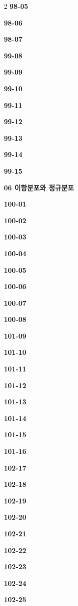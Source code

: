 \documentclass[10pt,a4paper]{article}
\begin{document}
\begin{multicols}{2}
\noindent\textbf{98-05}\ \par
\noindent\textbf{98-06}\ \par
\noindent\textbf{98-07}\ \par
\noindent\textbf{99-08}\ \par
\noindent\textbf{99-09}\ \par
\noindent\textbf{99-10}\ \par
\noindent\textbf{99-11}\ \par
\noindent\textbf{99-12}\ \par
\noindent\textbf{99-13}\ \par
\noindent\textbf{99-14}\ \par
\noindent\textbf{99-15}\ \par
\noindent\textbf{06 이항분포와 정규분포}\par\smallskip
\noindent\textbf{100-01}\ \par
\noindent\textbf{100-02}\ \par
\noindent\textbf{100-03}\ \par
\noindent\textbf{100-04}\ \par
\noindent\textbf{100-05}\ \par
\noindent\textbf{100-06}\ \par
\noindent\textbf{100-07}\ \par
\noindent\textbf{100-08}\ \par
\noindent\textbf{101-09}\ \par
\noindent\textbf{101-10}\ \par
\noindent\textbf{101-11}\ \par
\noindent\textbf{101-12}\ \par
\noindent\textbf{101-13}\ \par
\noindent\textbf{101-14}\ \par
\noindent\textbf{101-15}\ \par
\noindent\textbf{101-16}\ \par
\noindent\textbf{102-17}\ \par
\noindent\textbf{102-18}\ \par
\noindent\textbf{102-19}\ \par
\noindent\textbf{102-20}\ \par
\noindent\textbf{102-21}\ \par
\noindent\textbf{102-22}\ \par
\noindent\textbf{102-23}\ \par
\noindent\textbf{102-24}\ \par
\noindent\textbf{102-25}\ \par

\end{multicols}
\end{document}
